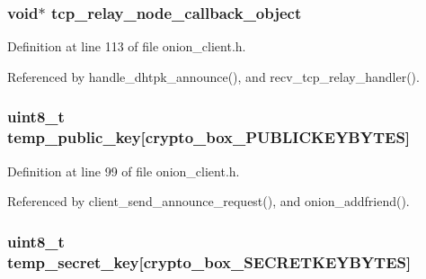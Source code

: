 \hypertarget{struct_onion___friend_a0da74cebd5ec2859b1de5db74c0dc528}{
\subsubsection[{tcp\+\_\+relay\+\_\+node\+\_\+callback\+\_\+object}]{\setlength{\rightskip}{0pt plus 5cm}void$\ast$ tcp\+\_\+relay\+\_\+node\+\_\+callback\+\_\+object}}\label{struct_onion___friend_a0da74cebd5ec2859b1de5db74c0dc528}


Definition at line 113 of file onion\+\_\+client.\+h.



Referenced by handle\+\_\+dhtpk\+\_\+announce(), and recv\+\_\+tcp\+\_\+relay\+\_\+handler().

\hypertarget{struct_onion___friend_afc342de3f1533c0adfd762a6fd0d20ab}{
\subsubsection[{temp\+\_\+public\+\_\+key}]{\setlength{\rightskip}{0pt plus 5cm}uint8\+\_\+t temp\+\_\+public\+\_\+key\mbox{[}crypto\+\_\+box\+\_\+\+P\+U\+B\+L\+I\+C\+K\+E\+Y\+B\+Y\+T\+E\+S\mbox{]}}}\label{struct_onion___friend_afc342de3f1533c0adfd762a6fd0d20ab}


Definition at line 99 of file onion\+\_\+client.\+h.



Referenced by client\+\_\+send\+\_\+announce\+\_\+request(), and onion\+\_\+addfriend().

\hypertarget{struct_onion___friend_a6de303feb7b7892cc6a38228554b3e78}{
\subsubsection[{temp\+\_\+secret\+\_\+key}]{\setlength{\rightskip}{0pt plus 5cm}uint8\+\_\+t temp\+\_\+secret\+\_\+key\mbox{[}crypto\+\_\+box\+\_\+\+S\+E\+C\+R\+E\+T\+K\+E\+Y\+B\+Y\+T\+E\+S\mbox{]}}}\label{struct_onion___friend_a6de303feb7b7892cc6a38228554b3e78}


